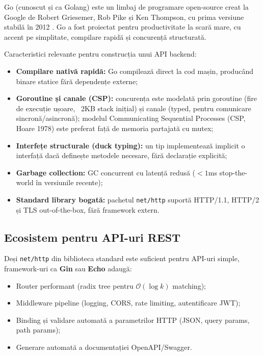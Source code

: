 Go (cunoscut și ca Golang) este un limbaj de programare open-source creat
la Google de Robert Griesemer, Rob Pike și Ken Thompson, cu prima versiune
stabilă în 2012 \cite{golangspec2024}. Go a fost proiectat pentru productivitate
la scară mare, cu accent pe simplitate, compilare rapidă și concurență structurată.

Caracteristici relevante pentru construcția unui API backend:
\begin{itemize}
    \item \textbf{Compilare nativă rapidă:} Go compilează direct la cod mașin,
    producând binare statice fără dependențe externe;
    \item \textbf{Goroutine și canale (CSP):} concurența este modelată prin
    goroutine (fire de execuție ușoare, ~2KB stack inițial) și canale (typed,
    pentru comunicare sincronă/asincronă); modelul Communicating Sequential
    Processes (CSP, Hoare 1978) este preferat față de memoria partajată cu mutex;
    \item \textbf{Interfețe structurale (duck typing):} un tip implementează
    implicit o interfață dacă definește metodele necesare, fără declarație
    explicită;
    \item \textbf{Garbage collection:} GC concurrent cu latență redusă
    ($<1$ms stop-the-world în versiunile recente);
    \item \textbf{Standard library bogată:} pachetul \texttt{net/http} suportă
    HTTP/1.1, HTTP/2 și TLS out-of-the-box, fără framework extern.
\end{itemize}

\subsection{Ecosistem pentru API-uri REST}
\label{subsec:go_api}

Deși \texttt{net/http} din biblioteca standard este suficient pentru API-uri
simple, framework-uri ca \textbf{Gin} sau \textbf{Echo} adaugă:
\begin{itemize}
    \item Router performant (radix tree pentru $\mathcal{O}(\log k)$ matching);
    \item Middleware pipeline (logging, CORS, rate limiting, autentificare JWT);
    \item Binding și validare automată a parametrilor HTTP (JSON, query params,
    path params);
    \item Generare automată a documentației OpenAPI/Swagger.
\end{itemize}

